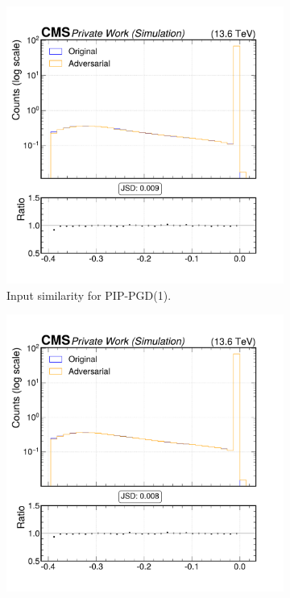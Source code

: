 \begin{figure}[h]
  \centering
  \begin{subfigure}[t]{0.32\textwidth}
    \includegraphics[width=\linewidth]{media/output/features/compare/combined_it_1/cmp_npf_arr_Npfcan_drminsv.pdf}
    \caption*{Input similarity for PIP-PGD(1).}
  \end{subfigure}\hfill
  \begin{subfigure}[t]{0.32\textwidth}
    \includegraphics[width=\linewidth]{media/output/features/compare/combined_it_2/cmp_npf_arr_Npfcan_drminsv.pdf}

\end{subfigure}
\end{figure}
